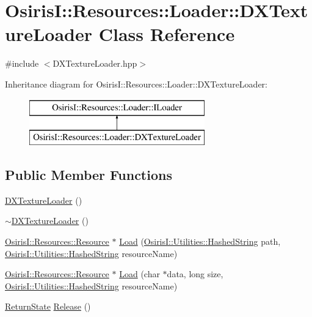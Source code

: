 \hypertarget{class_osiris_i_1_1_resources_1_1_loader_1_1_d_x_texture_loader}{\section{Osiris\-I\-:\-:Resources\-:\-:Loader\-:\-:D\-X\-Texture\-Loader Class Reference}
\label{class_osiris_i_1_1_resources_1_1_loader_1_1_d_x_texture_loader}
}


{\ttfamily \#include $<$D\-X\-Texture\-Loader.\-hpp$>$}

Inheritance diagram for Osiris\-I\-:\-:Resources\-:\-:Loader\-:\-:D\-X\-Texture\-Loader\-:\begin{figure}[H]
\begin{center}
\leavevmode
\includegraphics[height=2.000000cm]{class_osiris_i_1_1_resources_1_1_loader_1_1_d_x_texture_loader}
\end{center}
\end{figure}
\subsection*{Public Member Functions}
\begin{DoxyCompactItemize}
\item 
\hyperlink{class_osiris_i_1_1_resources_1_1_loader_1_1_d_x_texture_loader_a7d7aa04be6c8540a20a03f99aa1d0a4d}{D\-X\-Texture\-Loader} ()
\item 
\hyperlink{class_osiris_i_1_1_resources_1_1_loader_1_1_d_x_texture_loader_a7bb9b693f571f388fdf7d8c9a911df56}{$\sim$\-D\-X\-Texture\-Loader} ()
\item 
\hyperlink{class_osiris_i_1_1_resources_1_1_resource}{Osiris\-I\-::\-Resources\-::\-Resource} $\ast$ \hyperlink{class_osiris_i_1_1_resources_1_1_loader_1_1_d_x_texture_loader_a181b08ad6d235ddc2fa5a0b5c7bb6372}{Load} (\hyperlink{class_osiris_i_1_1_utilities_1_1_hashed_string}{Osiris\-I\-::\-Utilities\-::\-Hashed\-String} path, \hyperlink{class_osiris_i_1_1_utilities_1_1_hashed_string}{Osiris\-I\-::\-Utilities\-::\-Hashed\-String} resource\-Name)
\item 
\hyperlink{class_osiris_i_1_1_resources_1_1_resource}{Osiris\-I\-::\-Resources\-::\-Resource} $\ast$ \hyperlink{class_osiris_i_1_1_resources_1_1_loader_1_1_d_x_texture_loader_ae3f2e571c6b23cc2af81fcfca2ee4742}{Load} (char $\ast$data, long size, \hyperlink{class_osiris_i_1_1_utilities_1_1_hashed_string}{Osiris\-I\-::\-Utilities\-::\-Hashed\-String} resource\-Name)
\item 
\hyperlink{namespace_osiris_i_a8f53bf938dc75c65c6a529694514013e}{Return\-State} \hyperlink{class_osiris_i_1_1_resources_1_1_loader_1_1_d_x_texture_loader_a2445cad736f91ce05961b3469bcbd45b}{Release} ()
\end{DoxyCompactItemize}


